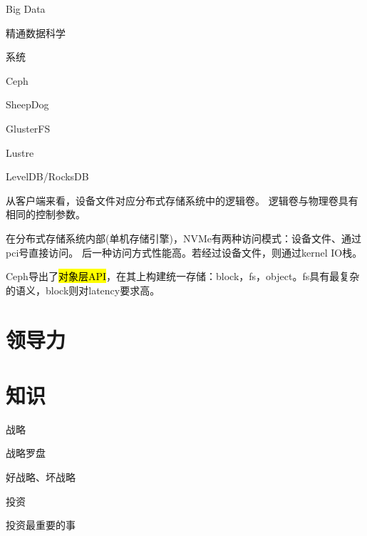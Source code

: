 Big Data
\begin{enumbox}
\item 精通数据科学
\end{enumbox}

系统
\begin{enumbox}
\item Ceph
\item SheepDog
\item GlusterFS
\item Lustre
\item LevelDB/RocksDB
\end{enumbox}

从客户端来看，设备文件对应分布式存储系统中的逻辑卷。
逻辑卷与物理卷具有相同的控制参数。

在分布式存储系统内部(单机存储引擎)，NVMe有两种访问模式：设备文件、通过pci号直接访问。
后一种访问方式性能高。若经过设备文件，则通过kernel IO栈。

Ceph导出了\hl{对象层API}，在其上构建统一存储：block，fs，object。fs具有最复杂的语义，block则对latency要求高。

\section{领导力}

\section{知识}

战略
\begin{enumbox}
\item 战略罗盘
\item 好战略、坏战略
\end{enumbox}

投资
\begin{enumbox}
\item 投资最重要的事
\end{enumbox}
